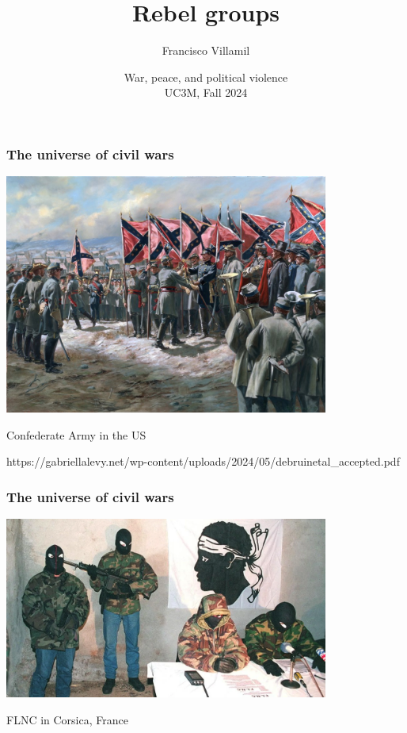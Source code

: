 \documentclass[aspectratio=43]{beamer}
\title{\huge Rebel groups}
\author{Francisco Villamil}
\date{War, peace, and political violence\\UC3M, Fall 2024}
\begin{document}
\begin{frame}
  \titlepage
\end{frame}

\begin{frame}
\frametitle{The universe of civil wars}
\centering

\includegraphics[width = 0.8\textwidth]{img/confederate}

\vspace{15pt}

Confederate Army in the US

https://gabriellalevy.net/wp-content/uploads/2024/05/debruinetal_accepted.pdf


\end{frame}

%
%
%
%

\begin{frame}
\frametitle{The universe of civil wars}
\centering

\includegraphics[width = 0.8\textwidth]{img/flnc}

FLNC in Corsica, France

\end{frame}
\end{document}
